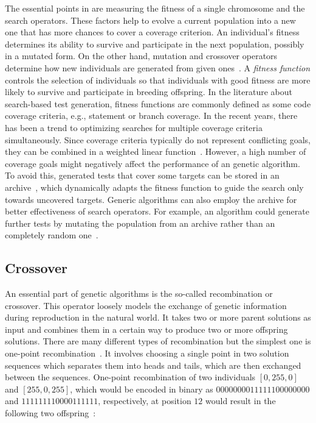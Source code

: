 \documentclass[paper=a4,%
  twoside,%
  BCOR4mm,%
  abstract=true,%
  toc=bibliography,%
  chapterprefix=true,%
  toc=bibliographynumbered,%
  open=right,%
  english,%
  pagesize=pdftex]{scrreprt}
\begin{document}
The essential points in  are measuring the fitness of a single chromosome and the search operators. These factors help to evolve a current population into a new one that has more chances to cover a coverage criterion. An individual's fitness determines its ability to survive and participate in the next population, possibly in a mutated form. On the other hand, mutation and crossover operators determine how new individuals are generated from given ones~\cite{Tonella2004}. A \emph{fitness function} controls the selection of individuals so that individuals with good fitness are more likely to survive and participate in breeding offspring. In the literature about search-based test generation, fitness functions are commonly defined as some code coverage criteria, e.g., statement or branch coverage. In the recent years, there has been a trend to optimizing searches for multiple coverage criteria simultaneously. Since coverage criteria typically do not represent conflicting goals, they can be combined in a weighted linear function~\cite{Rojas2015}. However, a high number of coverage goals might negatively affect the performance of an genetic algorithm. To avoid this, generated tests that cover some targets can be stored in an archive~\cite{Rojas2017}, which dynamically adapts the fitness function to guide the search only towards uncovered targets. Generic algorithms can also employ the archive for better effectiveness of search operators. For example, an algorithm could generate further tests by mutating the population from an archive rather than an completely random one~\cite{Campos2017}.

\subsection{Crossover}
\label{sec:background-crossover}
An essential part of genetic algorithms is the so-called recombination or crossover. This operator loosely models the exchange of genetic information during reproduction in the natural world. It takes two or more parent solutions as input and combines them in a certain way to produce two or more offspring solutions. There are many different types of recombination but the simplest one is one-point recombination~\cite{McMinn_2004}. It involves choosing a single point in two solution sequences which separates them into heads and tails, which are then exchanged between the sequences. One-point recombination of two individuals $[0, 255, 0]$ and $[255, 0, 255]$, which would be encoded in binary as $0000000011111100000000$ and $111111110000111111$, respectively, at position $12$ would result in the following two offspring~\cite{McMinn_2004}:
\end{document}
